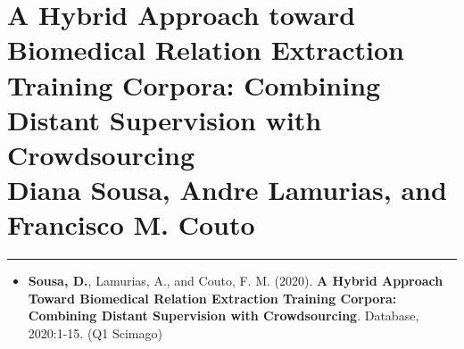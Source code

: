\hypertarget{6}{}


\chapter[A Hybrid Approach toward Biomedical Relation Extraction Training Corpora: Combining Distant Supervision with Crowdsourcing]
{\huge A Hybrid Approach toward Biomedical Relation Extraction Training Corpora: Combining Distant Supervision with Crowdsourcing \\
\Large \textmd{Diana Sousa, Andre Lamurias, and Francisco M. Couto}}

\vspace{-1.6cm}

\begingroup
\color{black}
\par\noindent\rule{\textwidth}{0.4pt}
\endgroup


\begin{itemize}[label=]
    \item{\textbf{Sousa, D.}, Lamurias, A., and Couto, F. M. (2020). \textbf{A Hybrid Approach Toward Biomedical Relation Extraction Training Corpora: Combining Distant Supervision with Crowdsourcing}. Database, 2020:1-15. (Q1 Scimago) \citep{sousa2020hybrid}} 
\end{itemize}

